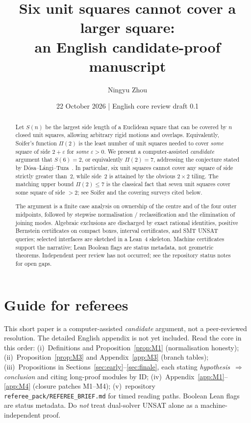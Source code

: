 \documentclass[11pt,reqno]{amsart}
\title[Six unit squares cannot cover a larger square]
{Six unit squares cannot cover a larger square:\\ an English candidate-proof manuscript}
\author{Ningyu Zhou}
\date{22 October 2026 | English core review draft 0.1}
\theoremstyle{definition}
\begin{document}
\begin{abstract}
Let $S(n)$ be the largest side length of a Euclidean square that can be covered
by $n$ closed unit squares, allowing arbitrary rigid motions and overlaps.
Equivalently, Soifer's function $\Pi(2)$ is the least number of unit squares
needed to cover \emph{some} square of side $2+\varepsilon$ for \emph{some}
$\varepsilon>0$.
We present a computer-assisted \emph{candidate} argument that $S(6)=2$, or
equivalently $\Pi(2)=7$, addressing the conjecture stated by
D\'osa--L\'angi--Tuza~\cite{DLT2026}.
In particular, six unit squares cannot cover any square of side strictly
greater than~$2$, while side~$2$ is attained by the obvious $2\times 2$ tiling.
The matching upper bound $\Pi(2)\le 7$ is the classical fact that seven unit
squares cover some square of side $>2$; see Soifer and the covering surveys
cited below.

The argument is a finite case analysis on ownership of the centre and of the
four outer midpoints, followed by stepwise normalisation / reclassification
and the elimination of joining modes.  Algebraic exclusions are discharged by
exact rational identities, positive Bernstein certificates on compact boxes,
interval certificates, and SMT UNSAT queries; selected interfaces are sketched
in a Lean~4 skeleton.  Machine certificates support the narrative; Lean Boolean
flags are status metadata, not geometric theorems.  Independent peer review has
not occurred; see the repository status notes for open gaps.
\end{abstract}


\maketitle

\tableofcontents

\section*{Guide for referees}
This short paper is a computer-assisted \emph{candidate} argument, not a
peer-reviewed resolution. The detailed English appendix is not yet included.
Read the core in this order: (i)~Definitions and
Proposition~\ref{prop:M1} (normalisation honesty); (ii)~Proposition~\ref{prop:M3}
and Appendix~\ref{app:M3} (branch tables); (iii)~Propositions in
Sections~\ref{sec:early}--\ref{sec:finale}, each stating
\emph{hypothesis~$\Rightarrow$ conclusion} and citing long-proof modules by
ID; (iv)~Appendix~\ref{app:M1}--\ref{app:M4} (closure patches M1--M4);
(v)~repository \texttt{referee\_pack/REFEREE\_BRIEF.md} for timed reading
paths.  Boolean Lean flags are status metadata.  Do \emph{not} treat
dual-solver UNSAT alone as a machine-independent proof.
\end{document}
